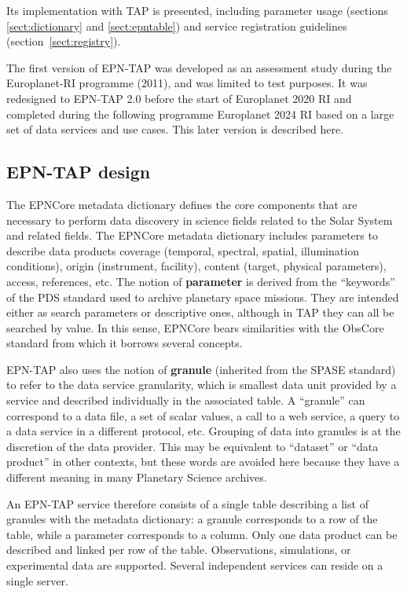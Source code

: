 \documentclass[11pt,a4paper]{ivoa}
\begin{document}
Its implementation with TAP is presented, including parameter usage
(sections \ref{sect:dictionary} and \ref{sect:epntable})
and service registration
guidelines (section~\ref{sect:registry}).

The first version of EPN-TAP was developed as an assessment study
during the Europlanet-RI programme (2011), and was limited to test purposes. It
was redesigned to EPN-TAP 2.0 before the start of Europlanet 2020 RI and
completed during the following programme Europlanet 2024 RI based on a large
set of data services and use cases. This later version is described here.


\subsection{EPN-TAP design}

The EPNCore metadata dictionary defines the core components that are
necessary to perform data discovery in science fields related to the
Solar System and related fields. The EPNCore metadata dictionary includes
parameters to describe data products coverage (temporal, spectral, spatial,
illumination conditions), origin (instrument, facility), content (target,
physical parameters), access, references, etc. The notion of \textbf{parameter} is
derived from the ``keywords'' of the PDS
standard used to archive planetary space missions. They are intended
either as search parameters or descriptive ones, although in TAP they
can all be searched by value. In this sense, EPNCore bears similarities
with the ObsCore standard \citep{2017ivoa.spec.0509L} from which it borrows several concepts.

EPN-TAP also uses the notion of \textbf{granule} (inherited from the SPASE standard)
to refer to the data service granularity, which is smallest data unit
provided by a service and described individually in the associated
table. A ``granule'' can correspond to a data file, a set of scalar
values, a call to a web service, a query to a data service in a different
protocol, etc.
Grouping of data into granules is at the discretion of the data
provider. This may be equivalent to ``dataset'' or ``data product''
in other contexts, but these words are avoided here because they have
a different meaning in many Planetary Science archives.

An EPN-TAP service therefore consists of a single table describing a
list of granules with the metadata dictionary: a granule corresponds
to a row of the table, while a parameter corresponds to a column.
Only one data product can be described and linked per row of the table.
Observations, simulations, or experimental data are supported.
Several independent services can reside on a single server.
\end{document}
